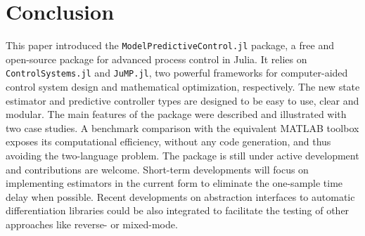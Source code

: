 \section{Conclusion}

This paper introduced the \texttt{ModelPredictiveControl.jl} package, a free and open-source package for advanced process control in Julia. It relies on \texttt{ControlSystems.jl} and \texttt{JuMP.jl}, two powerful frameworks for computer-aided control system design and mathematical optimization, respectively. The new state estimator and predictive controller types are designed to be easy to use, clear and modular. The main features of the package were described and illustrated with two case studies. A benchmark comparison with the equivalent MATLAB toolbox exposes its computational efficiency, without any code generation, and thus avoiding the two-language problem. The package is still under active development and contributions are welcome. Short-term developments will focus on implementing estimators in the current form to eliminate the one-sample time delay when possible. Recent developments on abstraction interfaces to automatic differentiation libraries could be also integrated to facilitate the testing of other approaches like reverse- or mixed-mode.